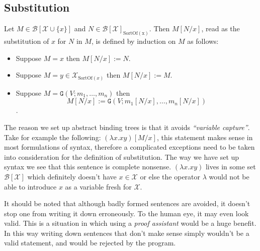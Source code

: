 \subsection{Substitution}

\begin{defin}\label{subst}
    Let $M \in \mathcal{B} [\mathcal{X} \cup \{ x \}]$ and $N \in \mathcal{B}[\mathcal{X}]_{\mathrm{SortOf(x)}}$. Then $M[N/x]$, read as the substitution of $x$ for $N$ in $M$, is defined by induction on $M$ as follows:
    \begin{itemize}
        \item Suppose $M = x$ then $M[N / x] := N$.
        \item Suppose $M = y \in \mathcal{X}_{\mathrm{SortOf}(x)}$ then $M[N / x] := M$.
        \item Suppose $M = \mathtt{G}(V; m_1 , \dots, m_n)$ then $$M[N / x] := \mathtt{G}(V; m_1[N / x], \dots, m_n[N / x])$$.
    \end{itemize}
\end{defin}

\begin{remark}
    The reason we set up abstract binding trees is that it avoids \emph{``variable capture''}. Take for example the following: $(\lambda x . x y)[M / x]$, this statement makes sense in most formulations of syntax, therefore a complicated exceptions need to be taken into consideration for the definition of substitution. The way we have set up syntax we see that this sentence is complete nonsense. $(\lambda x . x y)$ lives in some set $\mathcal{B}[\mathcal{X}]$ which definitely doesn't have $x \in \mathcal{X}$ or else the operator $\lambda$ would not be able to introduce $x$ as a variable fresh for $\mathcal{X}$.
\end{remark}

\begin{remark}
    It should be noted that although badly formed sentences are avoided, it doesn't stop one from writing it down erroneously. To the human eye, it may even look valid. This is a situation in which using a \emph{proof assistant} would be a huge benefit. In this way writing down sentences that don't make sense simply wouldn't be a valid statement, and would be rejected by the program.
\end{remark}


